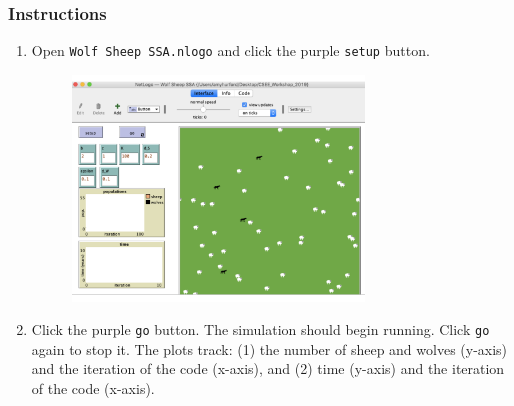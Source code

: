 \documentclass[11pt, oneside]{article}   	%
\begin{document}
\subsubsection*{Instructions}
\begin{enumerate}
\item Open \texttt{Wolf Sheep SSA.nlogo} and click the purple \texttt{setup} button. 

\begin{figure}[!ht]
\includegraphics[height=6cm]{setup}
\end{figure}

\item Click the purple \texttt{go} button. The simulation should begin running. Click \texttt{go} again to stop it. The plots track: (1) the number of sheep and wolves (y-axis) and the iteration of the code (x-axis), and (2) time (y-axis) and the iteration of the code (x-axis).


\end{enumerate}
\end{document}
